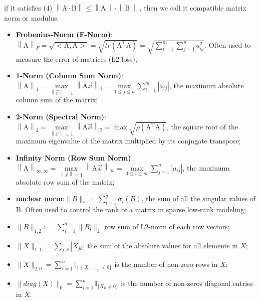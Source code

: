 \documentclass[12pt]{book}
\theoremstyle{definition}
\theoremstyle{remark}
\begin{document}
\begin{enumerate}
if it satisfies (4) $\left \| \mathrm{A\cdot B}\right \| \le \left \| \mathrm{A} \right \| \cdot \left \|\mathrm{B}\right \|$ , then we call it compatible matrix norm or modulus.
\begin{notionbox}[Note]\begin{itemize}
    \item \textbf{Frobenius-Norm (F-Norm)}: $\left \| \mathrm{A} \right \| _{F} = \sqrt{<\mathrm{A},\mathrm{A}>} = \sqrt{tr(\mathrm{A^T}\mathrm{A})} = \sqrt{\sum_{i=1}^{m}\sum_{j=1}^{n} a_{ij}^{2}}$. Often used to measure the error of matrices (L2 loss);
    \item \textbf{1-Norm (Column Sum Norm)}: $\left \| \mathrm {A}    \right \| _{1} = \underset{\left \| \vec{x} \right \|=1 }{\max}\left \| \mathrm {A}\vec{x}\right \|_{1}=\underset{1\le j\le n}{\max} \sum_{i=1}^{m}\left | a_{ij} \right |$,  the maximum absolute column sum of the matrix;
    \item \textbf{2-Norm (Spectral Norm)}: $\left \| \mathrm {A}\right \| _{2}=\underset{\left \| \vec{x} \right \| =1}{\max} \left \| \mathrm {A}  \vec{x}  \right \|_{2} =\max\sqrt{\rho (\mathrm{A^{T}A})}$, the square root of the maximum eigenvalue of the matrix multiplied by its conjugate transpose;
    \item \textbf{Infinity Norm (Row Sum Norm)}: $\left \| \mathrm {A}    \right \| _{\infty, \infty} = \underset{\left \| \vec{x} \right \|=1 }{\max}\left \| \mathrm {A}\vec{x}\right \|_{\infty}=\underset{1\le i\le m}{\max} \sum_{j=1}^{n}\left | a_{ij} \right |$, the maximum absolute row sum of the matrix;
    \item \textbf{nuclear norm}:$ \|B\|_*= \sum_{i=1}^q \sigma_i(B)$, the sum of all the singular values of B. Often used to control the rank of a matrix in sparse low-rank modeling;
    \item $\|B\|_{1,2}: =\sum_{i=1}^q \|B_i\|_2$ row sum of L2-norm of each row vectors;
    \item $\|X\|_{1,1} = \sum_{j,k}|X_{jk}|$ the sum of the absolute values for all elements in $X$;
    \item $\|X\|_{2,0} = \sum_{i=1}^n \mathbb{I}_{\{\|X_{i,:}\|_2 \neq 0\}}$ is the number of non-zero rows in $X$;
    \item $ \|diag(X)\|_0 = \sum_{i=1}^n \mathbb{I}_{\{X_{ii} \neq 0\}}$ is the number of non-zeros diagonal entries in $X$.
\end{itemize}
\end{notionbox}
\end{enumerate}
\end{document}
